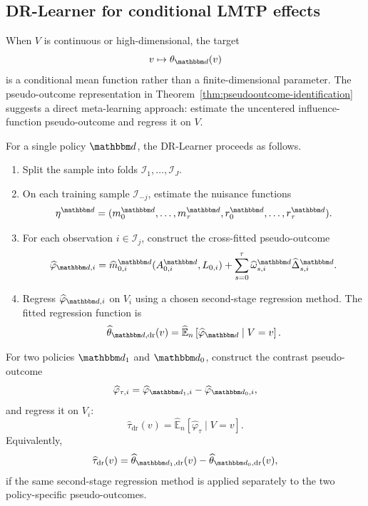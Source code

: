 \documentclass[11pt]{article}
\begin{document}
\subsection{DR-Learner for conditional LMTP effects}
\label{subsec:dr-learner}

When \(V\) is continuous or high-dimensional, the target
\[
  v\mapsto \theta_{\mathbbm d}(v)
\]
is a conditional mean function rather than a finite-dimensional parameter. The
pseudo-outcome representation in
Theorem~\ref{thm:pseudooutcome-identification} suggests a direct meta-learning
approach: estimate the uncentered influence-function pseudo-outcome and regress
it on \(V\).

For a single policy \(\mathbbm d\), the DR-Learner proceeds as follows.

\begin{enumerate}
  \item Split the sample into folds
  \(\mathcal I_1,\ldots,\mathcal I_J\).

  \item On each training sample \(\mathcal I_{-j}\), estimate the nuisance
  functions
  \[
    \eta^{\mathbbm d}
    =
    (m_0^{\mathbbm d},\ldots,m_\tau^{\mathbbm d},
     r_0^{\mathbbm d},\ldots,r_\tau^{\mathbbm d}).
  \]

  \item For each observation \(i\in\mathcal I_j\), construct the cross-fitted
  pseudo-outcome
  \[
    \widehat\varphi_{\mathbbm d,i}
    =
    \widehat m_{0,i}^{\mathbbm d}(A_{0,i}^{\mathbbm d},L_{0,i})
    +
    \sum_{s=0}^{\tau}
    \widehat\omega_{s,i}^{\mathbbm d}
    \widehat\Delta_{s,i}^{\mathbbm d}.
  \]

  \item Regress \(\widehat\varphi_{\mathbbm d,i}\) on \(V_i\) using a chosen
  second-stage regression method. The fitted regression function is
  \[
    \widehat\theta_{\mathbbm d,\mathrm{dr}}(v)
    =
    \widehat{\mathbb{E}}_n
    \left[
      \widehat\varphi_{\mathbbm d}
      \mid V=v
    \right].
  \]
\end{enumerate}

For two policies \(\mathbbm d_1\) and \(\mathbbm d_0\), construct the contrast
pseudo-outcome
\[
  \widehat\varphi_{\tau,i}
  =
  \widehat\varphi_{\mathbbm d_1,i}
  -
  \widehat\varphi_{\mathbbm d_0,i},
\]
and regress it on \(V_i\):
\[
  \widehat\tau_{\mathrm{dr}}(v)
  =
  \widehat{\mathbb{E}}_n
  \left[
    \widehat\varphi_{\tau}
    \mid V=v
  \right].
\]
Equivalently,
\[
  \widehat\tau_{\mathrm{dr}}(v)
  =
  \widehat\theta_{\mathbbm d_1,\mathrm{dr}}(v)
  -
  \widehat\theta_{\mathbbm d_0,\mathrm{dr}}(v),
\]
if the same second-stage regression method is applied separately to the two
policy-specific pseudo-outcomes.
\end{document}
